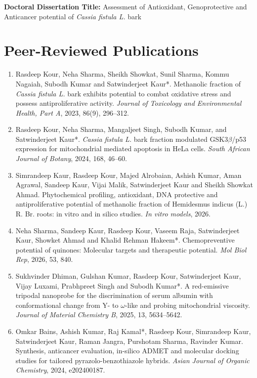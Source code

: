 \documentclass[11pt,a4paper]{article}
\begin{document}
\textbf{Doctoral Dissertation Title:} Assessment of Antioxidant, Genoprotective and Anticancer potential of \textit{Cassia fistula L.} bark

\vspace{0.5cm}

\section*{Peer-Reviewed Publications}

\begin{enumerate}
  \item Rasdeep Kour, Neha Sharma, Sheikh Showkat, Sunil Sharma, Kommu Nagaiah, Subodh Kumar and Satwinderjeet Kaur*. Methanolic fraction of \textit{Cassia fistula L.} bark exhibits potential to combat oxidative stress and possess antiproliferative activity. \textit{Journal of Toxicology and Environmental Health, Part A}, 2023, 86(9), 296--312.
  \item Rasdeep Kour, Neha Sharma, Mangaljeet Singh, Subodh Kumar, and Satwinderjeet Kaur*. \textit{Cassia fistula L.} bark fraction modulated GSK3$\beta$/p53 expression for mitochondrial mediated apoptosis in HeLa cells. \textit{South African Journal of Botany}, 2024, 168, 46--60.
  \item Simrandeep Kaur, Rasdeep Kour, Majed Alrobaian, Ashish Kumar, Aman Agrawal, Sandeep Kaur, Vijai Malik, Satwinderjeet Kaur and Sheikh Showkat Ahmad. Phytochemical profiling, antioxidant, DNA protective and antiproliferative potential of methanolic fraction of Hemidesmus indicus (L.) R. Br. roots: in vitro and in silico studies. \textit{In vitro models}, 2026.
  \item Neha Sharma, Sandeep Kaur, Rasdeep Kour, Vaseem Raja, Satwinderjeet Kaur, Showket Ahmad and Khalid Rehman Hakeem*. Chemopreventive potential of quinones: Molecular targets and therapeutic potential. \textit{Mol Biol Rep}, 2026, 53, 840.
  \item Sukhvinder Dhiman, Gulshan Kumar, Rasdeep Kour, Satwinderjeet Kaur, Vijay Luxami, Prabhpreet Singh and Subodh Kumar*. A red-emissive tripodal nanoprobe for the discrimination of serum albumin with conformational change from Y- to $\omega$-like and probing mitochondrial viscosity. \textit{Journal of Material Chemistry B}, 2025, 13, 5634--5642.
  \item Omkar Bains, Ashish Kumar, Raj Kamal*, Rasdeep Kour, Simrandeep Kaur, Satwinderjeet Kaur, Raman Jangra, Purshotam Sharma, Ravinder Kumar. Synthesis, anticancer evaluation, in-silico ADMET and molecular docking studies for tailored pyrazolo-benzothiazole hybrids. \textit{Asian Journal of Organic Chemistry}, 2024, e202400187.

\end{enumerate}
\end{document}
